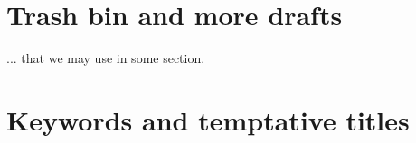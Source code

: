 \documentclass[12pt]{book}
\begin{document}
%
%

\printbibliography[heading=bibintoc]

%
%

\setcounter{chapter}{-1}
\chapter{Trash bin and more drafts}
... that we may use in some section.
\vfill\minitoc\newpage

\newpage
\newpage
\newpage

%
%

\setcounter{chapter}{-1}


\setcounter{chapter}{-1}
\chapter{Keywords and temptative titles}

\end{document}
